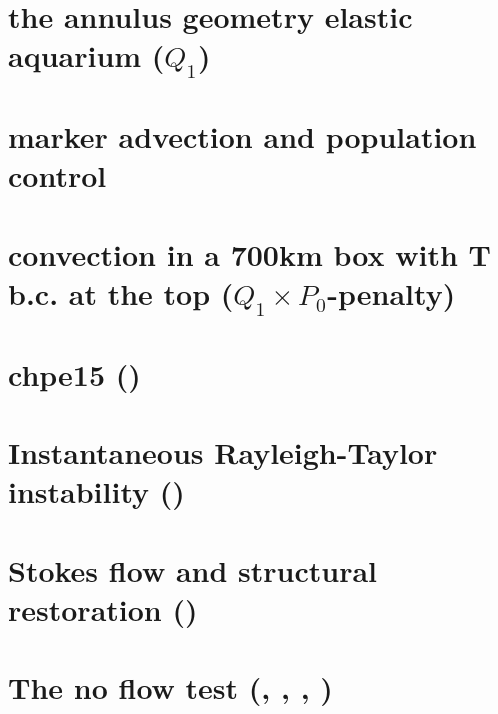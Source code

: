 \documentclass[a4paper,11pt]{report}
\begin{document}
\chapter{the annulus geometry elastic aquarium ($Q_1$)\label{f36}}%

\chapter{marker advection and population control \label{f37}} %

\chapter{convection in a 700km box with T b.c. at the top  ($Q_1\times P_0$-penalty) \label{f38}} %

\chapter{chpe15 (\QtwoQone) \label{f39}} %

\chapter{Instantaneous Rayleigh-Taylor instability (\QtwoQone) \label{f40}} %

\chapter{Stokes flow and structural restoration (\QtwoQone) \label{f41}} %

\chapter{The no flow test (\QonePzero, \QtwoQone, \QthreeQtwo, \QfourQthree)\label{f42}} %
\end{document}
